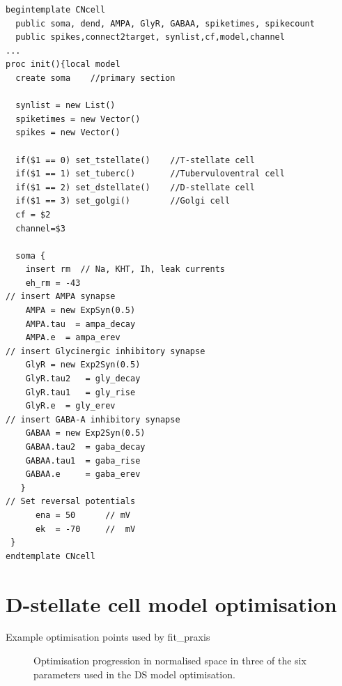 \begin{lstlisting}[label=lst:CellTemplate,caption=Rothman and Manis cochlear
  nucleus cell template (in CNcell.tem)]
begintemplate CNcell
  public soma, dend, AMPA, GlyR, GABAA, spiketimes, spikecount
  public spikes,connect2target, synlist,cf,model,channel
...
proc init(){local model
  create soma    //primary section

  synlist = new List()
  spiketimes = new Vector()
  spikes = new Vector()
    
  if($1 == 0) set_tstellate()    //T-stellate cell
  if($1 == 1) set_tuberc()       //Tubervuloventral cell
  if($1 == 2) set_dstellate()    //D-stellate cell
  if($1 == 3) set_golgi()        //Golgi cell
  cf = $2
  channel=$3

  soma {
    insert rm  // Na, KHT, Ih, leak currents 
    eh_rm = -43 
// insert AMPA synapse 
    AMPA = new ExpSyn(0.5)
    AMPA.tau  = ampa_decay
    AMPA.e 	= ampa_erev
// insert Glycinergic inhibitory synapse 
    GlyR = new Exp2Syn(0.5)
    GlyR.tau2	= gly_decay
    GlyR.tau1	= gly_rise
    GlyR.e 	= gly_erev
// insert GABA-A inhibitory synapse 
    GABAA = new Exp2Syn(0.5)
    GABAA.tau2 	= gaba_decay
    GABAA.tau1 	= gaba_rise
    GABAA.e 	= gaba_erev
   }
// Set reversal potentials 
      ena = 50		// mV
      ek  = -70		//  mV
 }
endtemplate CNcell 

\end{lstlisting}

\section{D-stellate cell model optimisation}

Example optimisation points used by fit_praxis 
\begin{figure}[htb]
\centering
{}
 \caption{Optimisation progression in normalised space in three of the six parameters used in the DS model optimisation.} \label{fig:DShandtuned}
 \end{figure}


